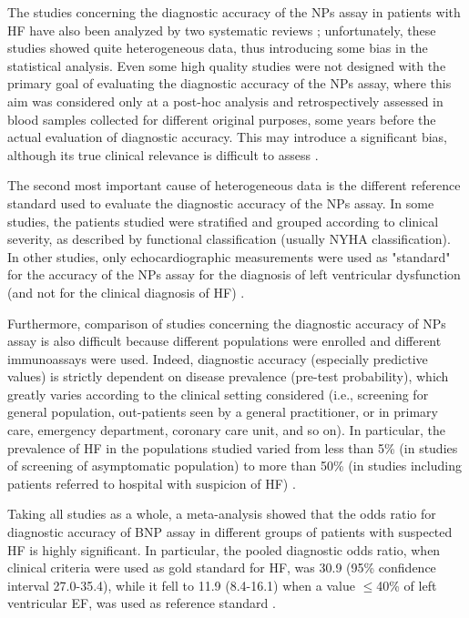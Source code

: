 \documentclass[14pt,a4paper,onecolumn]{extarticle}
\begin{document}
The studies concerning the diagnostic accuracy of the NPs assay in patients with HF have also been analyzed by two systematic reviews \citep{bib35} \citep{bib372}; unfortunately, these studies showed quite heterogeneous data, thus introducing some bias in the statistical analysis. Even some high quality studies were not designed with the primary goal of evaluating the diagnostic accuracy of the NPs assay, where this aim was considered only at a post-hoc analysis and retrospectively assessed in blood samples collected for different original purposes, some years before the actual evaluation of diagnostic accuracy. This may introduce a significant bias, although its true clinical relevance is difficult to assess \citep{bib35}.

The second most important cause of heterogeneous data is the different reference standard used to evaluate the diagnostic accuracy of the NPs assay. In some studies, the patients studied were stratified and grouped according to clinical severity, as described by functional classification (usually NYHA classification). In other studies, only echocardiographic measurements were used as "standard" for the accuracy of the NPs assay for the diagnosis of left ventricular dysfunction (and not for the clinical diagnosis of HF) \citep{bib372}.

Furthermore, comparison of studies concerning the diagnostic accuracy of NPs assay is also difficult because different populations were enrolled and different immunoassays were used. Indeed, diagnostic accuracy (especially predictive values) is strictly dependent on disease prevalence (pre-test probability), which greatly varies according to the clinical setting considered (i.e., screening for general population, out-patients seen by a general practitioner, or in primary care, emergency department, coronary care unit, and so on). In particular, the prevalence of HF in the populations studied varied from less than 5\% (in studies of screening of asymptomatic population) to more than 50\% (in studies including patients referred to hospital with suspicion of HF) \citep{bib35}.

Taking all studies as a whole, a meta-analysis showed that the odds ratio for diagnostic accuracy of BNP assay in different groups of patients with suspected HF is highly significant. In particular, the pooled diagnostic odds ratio, when clinical criteria were used as gold standard for HF, was 30.9 (95\% confidence interval 27.0-35.4), while it fell to 11.9 (8.4-16.1) when a value $\leq$40\% of left ventricular EF, was used as reference standard \citep{bib372}.
\end{document}
